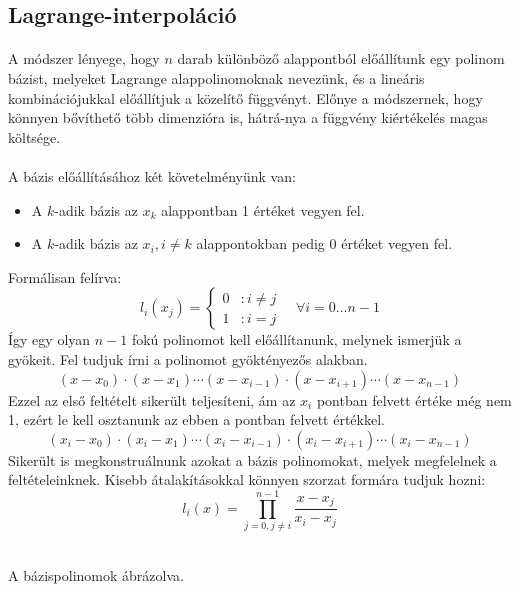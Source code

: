 \documentclass{elteikthesis}
\begin{document}
\subsection{Lagrange-interpoláció}
\paragraph{}
A módszer lényege, hogy $n$ darab különböző alappontból előállítunk egy polinom bázist, melyeket Lagrange alappolinomoknak nevezünk, és a lineáris kombinációjukkal előállítjuk a közelítő függvényt. Előnye a módszernek, hogy könnyen bővíthető több dimenzióra is, hátrá-nya a függvény kiértékelés magas költsége.
\paragraph{}
A bázis előállításához két követelményünk van:
\begin{itemize}
\item A $k$-adik bázis az $x_k$ alappontban 1 értéket vegyen fel.
\item A $k$-adik bázis az $x_i, i \neq k$ alappontokban pedig 0 értéket vegyen fel.
\end{itemize}
Formálisan felírva:
$$
	l_i(x_j) =
	\left\{
	  \begin{array}{lr}
	    0 & : i \neq j\\
	    1 & : i = j
	  \end{array}
	\right.
	\quad \forall i = 0\dots{n-1}
$$
Így egy olyan $n-1$ fokú polinomot kell előállítanunk, melynek ismerjük a gyökeit. Fel tudjuk írni a polinomot gyöktényezős alakban.
$$(x-x_0)\cdot(x-x_1)\cdots(x-x_{i-1})\cdot(x-x_{i+1})\cdots(x-x_{n-1})$$
Ezzel az első feltételt sikerült teljesíteni, ám az $x_i$ pontban felvett értéke még nem 1, ezért le kell osztanunk az ebben a pontban felvett értékkel.
$$(x_i-x_0)\cdot(x_i-x_1)\cdots(x_i-x_{i-1})\cdot(x_i-x_{i+1})\cdots(x_i-x_{n-1})$$
Sikerült is megkonstruálnunk azokat a bázis polinomokat, melyek megfelelnek a feltételeinknek. Kisebb átalakításokkal könnyen szorzat formára tudjuk hozni:
$$l_i(x) = \prod_{j = 0, j \neq i}^{n-1} \frac{x-x_j}{x_i-x_j}$$
\begin{center}
 \\
{\footnotesize A bázispolinomok ábrázolva.}
\end{center}
\end{document}
